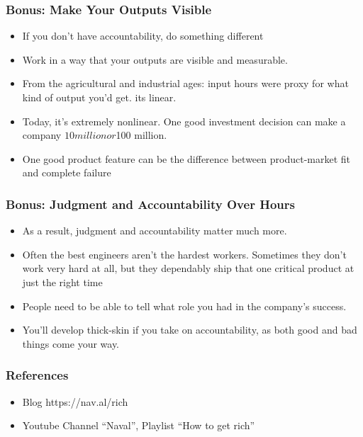 \begin{frame}[fragile]
\frametitle{Bonus: Make Your Outputs Visible}
\begin{itemize}
\item If you don’t have accountability, do something different
\item Work in a way that your outputs are visible and
measurable. 
\item   From the agricultural and industrial ages: input hours were proxy for what kind of output you’d get.  its linear.
\item Today, it’s extremely nonlinear. One good investment decision can make a company $10 million or $100
million. 
\item One good product feature can be the difference between product-market fit and complete failure
\end{itemize}
\end{frame}

\begin{frame}[fragile]
\frametitle{Bonus: Judgment and Accountability Over Hours}
\begin{itemize}
\item As a result, judgment and accountability matter much more.
\item Often the best engineers aren’t the hardest
workers. Sometimes they don’t work very hard at all, but they dependably ship that one critical product at just the right time
\item People need to be able to tell what role you had in the company’s success. 
\item You’ll develop thick-skin if you take on accountability, as both good and bad things come your way.
\end{itemize}
\end{frame}

\begin{frame}[fragile]\frametitle{References}
\begin{itemize}
\item Blog https://nav.al/rich
\item Youtube Channel ``Naval'', Playlist ``How to get rich''
\end{itemize}
\end{frame}